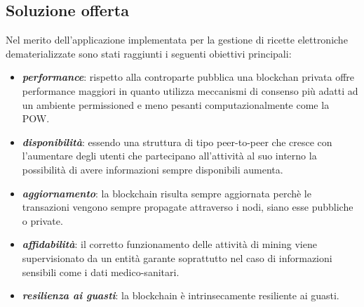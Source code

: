 \subsection{Soluzione offerta}
Nel merito dell'applicazione implementata per la gestione di ricette elettroniche dematerializzate sono stati raggiunti i seguenti obiettivi principali:
\begin{itemize}
	\item \textit{\textbf{performance}}: rispetto alla controparte pubblica una blockchan privata offre performance maggiori in quanto utilizza meccanismi di consenso più adatti ad un ambiente permissioned e meno pesanti computazionalmente come la POW.
	\item \textit{\textbf{disponibilità}}: essendo una struttura di tipo peer-to-peer che cresce con l'aumentare degli utenti che partecipano all'attività al suo interno la possibilità di avere informazioni sempre disponibili aumenta.
	\item \textit{\textbf{aggiornamento}}: la blockchain risulta sempre aggiornata perchè le transazioni vengono sempre propagate attraverso i nodi, siano esse pubbliche o private.
	\item \textit{\textbf{affidabilità}}: il corretto funzionamento delle attività di mining viene supervisionato da un entità garante soprattutto nel caso di informazioni sensibili come i dati medico-sanitari.
	\item \textit{\textbf{resilienza ai guasti}}: la blockchain è intrinsecamente resiliente ai guasti.
\end{itemize}